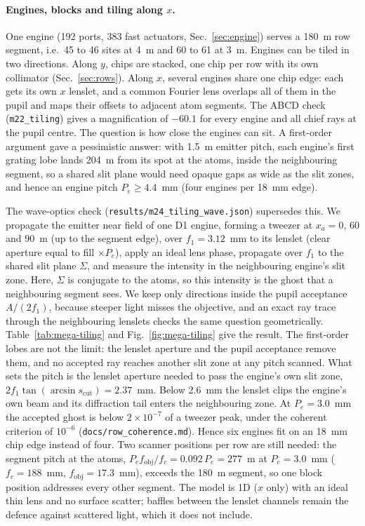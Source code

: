 \paragraph{Engines, blocks and tiling along $x$.} One engine (192 ports, 383 fast actuators, Sec.~\ref{sec:engine}) serves a 180~\textmu m row segment, i.e.\ 45 to 46 sites at 4~\textmu m and 60 to 61 at 3~\textmu m. Engines can be tiled in two directions. Along $y$, chips are stacked, one chip per row with its own collimator (Sec.~\ref{sec:rows}). Along $x$, several engines share one chip edge: each gets its own $x$ lenslet, and a common Fourier lens overlaps all of them in the pupil and maps their offsets to adjacent atom segments. The ABCD check (\texttt{m22\_tiling}) gives a magnification of $-60.1$ for every engine and all chief rays at the pupil centre. The question is how close the engines can sit. A first-order argument gave a pessimistic answer: with 1.5~\textmu m emitter pitch, each engine's first grating lobe lands 204~\textmu m from its spot at the atoms, inside the neighbouring segment, so a shared slit plane would need opaque gaps as wide as the slit zones, and hence an engine pitch $P_e\geq4.4$~mm (four engines per 18~mm edge).

The wave-optics check (\texttt{results/\allowbreak m24\_tiling\_wave.json}) supersedes this. We propagate the emitter near field of one D1 engine, forming a tweezer at $x_a=0$, 60 and 90~\textmu m (up to the segment edge), over $f_1=3.12$~mm to its lenslet (clear aperture equal to fill $\times P_e$), apply an ideal lens phase, propagate over $f_1$ to the shared slit plane $\Sigma$, and measure the intensity in the neighbouring engine's slit zone. Here, $\Sigma$ is conjugate to the atoms, so this intensity is the ghost that a neighbouring segment sees. We keep only directions inside the pupil acceptance $A/(2f_1)$, because steeper light misses the objective, and an exact ray trace through the neighbouring lenslets checks the same question geometrically. Table~\ref{tab:mega-tiling} and Fig.~\ref{fig:mega-tiling} give the result. The first-order lobes are not the limit: the lenslet aperture and the pupil acceptance remove them, and no accepted ray reaches another slit zone at any pitch scanned. What sets the pitch is the lenslet aperture needed to pass the engine's own slit zone, $2f_1\tan(\arcsin s_\mathrm{cut})=2.37$~mm. Below 2.6~mm the lenslet clips the engine's own beam and its diffraction tail enters the neighbouring zone. At $P_e=3.0$~mm the accepted ghost is below $2\times10^{-7}$ of a tweezer peak, under the coherent criterion of $10^{-6}$ (\texttt{docs/\allowbreak row\_coherence.md}). Hence six engines fit on an 18~mm chip edge instead of four. Two scanner positions per row are still needed: the segment pitch at the atoms, $P_e f_\mathrm{obj}/f_c=0.092\,P_e=277$~\textmu m at $P_e=3.0$~mm ($f_c=188$~mm, $f_\mathrm{obj}=17.3$~mm), exceeds the 180~\textmu m segment, so one block position addresses every other segment. The model is 1D ($x$ only) with an ideal thin lens and no surface scatter; baffles between the lenslet channels remain the defence against scattered light, which it does not include.

